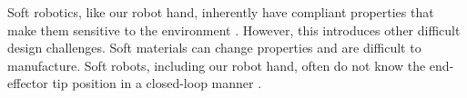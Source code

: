 Soft robotics, like our robot hand, inherently have compliant properties that make them sensitive to the environment \cite{rus2015design, wang2018toward}.  However, this introduces other difficult design challenges.  Soft materials can change properties and are difficult to manufacture.  Soft robots, including our robot hand, often do not know the end-effector tip position in a closed-loop manner \cite{butterfass2001dlr, bauer2022towards}.